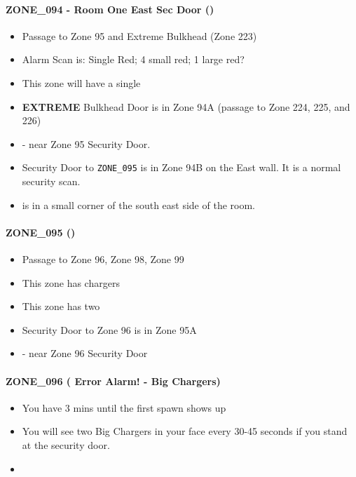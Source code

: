 \paragraph{ZONE\_094 - Room One East Sec Door ()}
\begin{itemize}
    \item {\color{Blue}Passage to Zone 95 and Extreme Bulkhead (Zone 223)}
    \item Alarm Scan is: Single Red; 4 small red; 1 large red?
    \item This zone will have a single \gtfoenemyscout{}
    \item \textbf{EXTREME} Bulkhead Door is in Zone 94A (passage to Zone 224, 225, and 226)
    \item {} - near Zone 95 Security Door.
    \item Security Door to \texttt{ZONE\_095} is in Zone 94B on the East wall.  It is a normal security scan.
    \item {} is in a small corner of the south east side of the room.
\end{itemize}

\paragraph{ZONE\_095 (\securityscan{})}
\begin{itemize}
    \item {\color{Blue}Passage to Zone 96, Zone 98, Zone 99}
    \item This zone has chargers
    \item This zone has two \gtfoenemyscout{}
    \item Security Door to Zone 96 is in Zone 95A
    \item {} - near Zone 96 Security Door
\end{itemize}

\paragraph{ZONE\_096 ( Error Alarm! - Big Chargers)}
\begin{itemize}
    \item You have 3 mins until the first spawn shows up
    \item You will see two Big Chargers in your face every 30-45 seconds if you stand at the security door.
    \item {}
\end{itemize}

